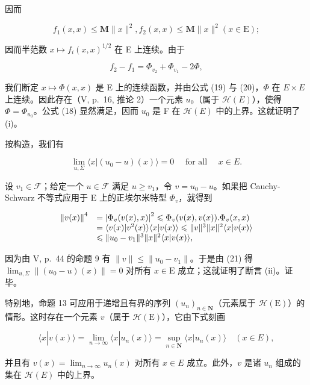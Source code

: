 因而

\[
f _ {1} (x, x) \leqslant \mathbf {M} \| x \| ^ {2}, f _ {2} (x, x) \leqslant \mathbf {M} \| x \| ^ {2} (x \in \mathrm{E});
\]

因而半范数 \(x \mapsto f_i(x, x)^{1/2}\) 在 E 上连续。由于

\[
f _ {2} - f _ {1} = \Phi_ {v _ {2}} + \Phi_ {v _ {1}} - 2 \Phi ,
\]

我们断定 \(x \mapsto \Phi(x, x)\) 是 E 上的连续函数，并由公式 (19) 与 (20)，\(\Phi\) 在 \(E \times E\) 上连续。因此存在（V, p.~16, 推论 2）一个元素 \(u_{0}\)（属于 \(\mathcal{H}(E)\)），使得 \(\Phi = \Phi_{u_{0}}\)。公式 (18) 显然满足，因而 \(u_{0}\) 是 F 在 \(\mathcal{H}(E)\) 中的上界。这就证明了 (i)。

按构造，我们有

\[
\lim _ {u, \Sigma} \langle x | (u _ {0} - u) (x) \rangle = 0 \quad \text { for   all } \quad x \in E.\tag{21}
\]

设 \(v_{1} \in \mathcal{F}\)；给定一个 \(u \in \mathcal{F}\) 满足 \(u \geqslant v_{1}\)，令 \(v = u_{0} - u\)。如果把 Cauchy-Schwarz 不等式应用于 E 上的正埃尔米特型 \(\Phi_v\)，就得到

\[
\begin{array}{r l} \left\| v (x) \right\| ^ {4} & = \left| \Phi_ {v} (v (x), x) \right| ^ {2} \leqslant \Phi_ {v} (v (x), v (x)). \Phi_ {v} (x, x) \\ & = \langle v (x) | v ^ {2} (x) \rangle \langle x | v (x) \rangle \leqslant \| v \| ^ {3} \| x \| ^ {2} \langle x | v (x) \rangle \\ & \leqslant \| u _ {0} - v _ {1} \| ^ {3} \| x \| ^ {2} \langle x | v (x) \rangle , \end{array}
\]

因为由 V, p.~44 的命题 9 有 \(\| v\| \leqslant \| u_0 - v_1\|\)。于是由 (21) 得 \(\lim_{u,\Sigma}\left\| (u_0 - u)(x)\right\| = 0\) 对所有 \(x\in \mathrm{E}\) 成立；这就证明了断言 (ii)。证毕。

特别地，命题 13 可应用于递增且有界的序列 \((u_n)_{n\in \mathbf{N}}\)（元素属于 \(\mathcal{H}(\mathrm{E})\)）的情形。这时存在一个元素 \(v\)（属于 \(\mathcal{H}(\mathrm{E})\)），它由下式刻画

\[
\langle x | v (x) \rangle = \lim _ {n \rightarrow \infty} \langle x | u _ {n} (x) \rangle = \sup _ {n \in \mathbf {N}} \langle x | u _ {n} (x) \rangle \quad (x \in E),
\]

并且有 \(v(x) = \lim_{n\to \infty}u_n(x)\) 对所有 \(x\in E\) 成立。此外，\(v\) 是诸 \(u_{n}\) 组成的集在 \(\mathcal{H}(E)\) 中的上界。

